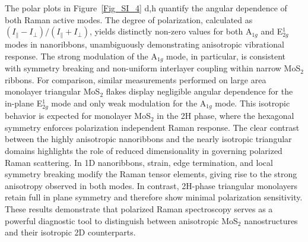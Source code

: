 \documentclass[journal=jacsnano,manuscript=article]{achemso}
\begin{document}
\begin{suppinfo}
\begin{itemize}
The polar plots in Figure~\ref {Fig_SI_4} d,h quantify the angular dependence of both Raman active modes. The degree of polarization, calculated as $(I_{\parallel}-I_{\perp})/(I_{\parallel}+I_{\perp})$, yields distinctly non-zero values for both A$_{1g}$ and E$^{1}_{2g}$ modes in nanoribbons, unambiguously demonstrating anisotropic vibrational response. The strong modulation of the A$_{1g}$ mode, in particular, is consistent with symmetry breaking and non-uniform interlayer coupling within narrow MoS$_2$ ribbons.
For comparison, similar measurements performed on large area monolayer triangular MoS$_2$ flakes display negligible angular dependence for the in-plane E$^{1}_{2g}$ mode and only weak modulation for the A$_{1g}$ mode. This isotropic behavior is expected for monolayer MoS$_2$ in the 2H phase, where the hexagonal symmetry enforces polarization independent Raman response.
The clear contrast between the highly anisotropic nanoribbons and the nearly isotropic triangular domains highlights the role of reduced dimensionality in governing polarized Raman scattering. In 1D nanoribbons, strain, edge termination, and local symmetry breaking modify the Raman tensor elements, giving rise to the strong anisotropy observed in both modes. In contrast, 2H-phase triangular monolayers retain full in plane symmetry and therefore show minimal polarization sensitivity. These results demonstrate that polarized Raman spectroscopy serves as a powerful diagnostic tool to distinguish between  anisotropic MoS$_2$ nanostructures and their isotropic 2D counterparts.


\end{itemize}
\end{suppinfo}
\end{document}
